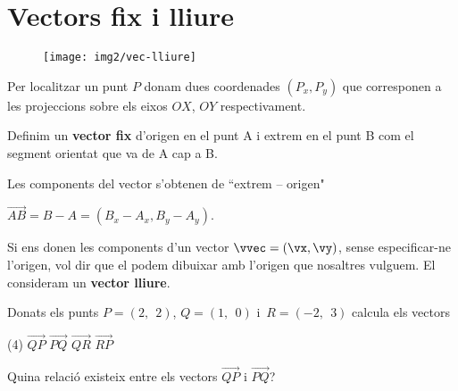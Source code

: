 \documentclass[11pt, a4paper, pdf]{article}
\begin{document}
 
 \vspace{-1cm}
 
 
 \section{Vectors fix i lliure}
 \begin{theorybox}
 			\begin{wrapfigure}{R}{0.25\textwidth} 
 		\vspace{-0.5cm}
 		\begin{center}
 			\texttt{[image: img2/vec-lliure]}
 		\end{center}
 	\end{wrapfigure}
 	Per localitzar un punt $P$ donam dues coordenades $(P_x, P_y)$ que corresponen a les projeccions sobre els eixos $OX$, $OY$ respectivament.
 	
 	Definim un \textbf{vector fix} d'origen en el punt A i extrem en el punt B com el segment orientat que va de A cap a B. 
 	
 	Les components del vector s'obtenen de ``extrem -- origen" 
 	
 	$\overrightarrow{AB}=B-A=(B_x-A_x, B_y-A_y)$.
 	
 	Si ens donen les components d'un vector $\vvec=(\vx, \vy)$, sense especificar-ne l'origen, vol dir que el podem dibuixar amb l'origen que nosaltres vulguem. El consideram un \textbf{vector lliure}.
 \end{theorybox}

\begin{mylist}
	\item Donats els punts $P=\left(2,\, \; 2\right)$, $Q=\left(1,\, \; 0\right)$ i $\, R=\left(-2,\, \; 3\right)$ calcula els vectors
	\begin{tasks}(4)
		\task $\overrightarrow{QP}$    
		\task $\overrightarrow{PQ}$
		\task $\overrightarrow{QR}$  
		\task $\overrightarrow{RP}$
	\end{tasks}
	Quina relació existeix entre els vectors $\overrightarrow{QP}$ i $\overrightarrow{PQ}$?
\end{mylist}

\vspace{-0.5cm}

\end{document}
